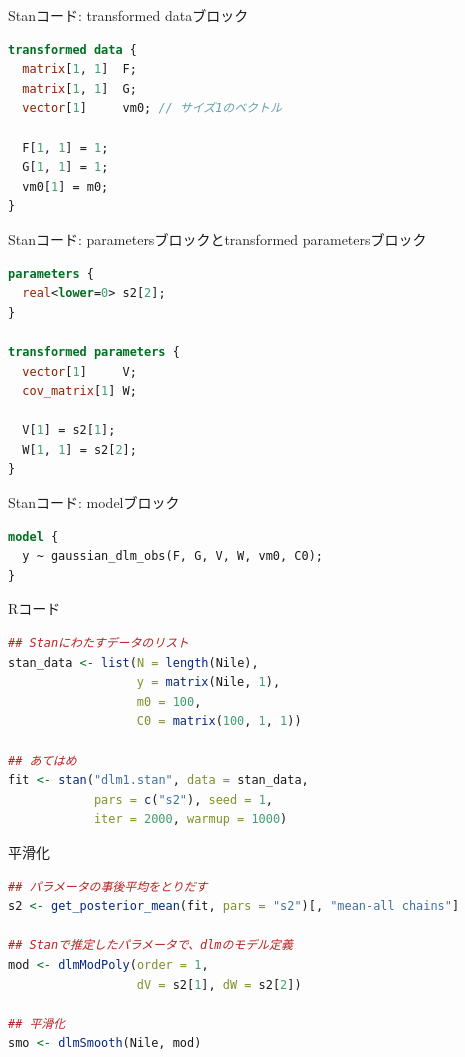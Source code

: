 \documentclass[dvipdfmx,12pt]{beamer}
\begin{document}
\begin{frame}[fragile]{Stanコード: transformed dataブロック}
  \begin{lstlisting}[language=Stan]
transformed data {
  matrix[1, 1]  F;
  matrix[1, 1]  G;
  vector[1]     vm0; // サイズ1のベクトル

  F[1, 1] = 1;
  G[1, 1] = 1;
  vm0[1] = m0;
}
  \end{lstlisting}
\end{frame}

\begin{frame}[fragile]{Stanコード: parametersブロックとtransformed parametersブロック}
  \begin{lstlisting}[language=Stan]
parameters {
  real<lower=0> s2[2];
}

transformed parameters {
  vector[1]     V;
  cov_matrix[1] W;

  V[1] = s2[1];
  W[1, 1] = s2[2];
}
  \end{lstlisting}
\end{frame}

\begin{frame}[fragile]{Stanコード: modelブロック}
  \begin{lstlisting}[language=Stan]
model {
  y ~ gaussian_dlm_obs(F, G, V, W, vm0, C0);
}
  \end{lstlisting}
\end{frame}

\begin{frame}[fragile]{Rコード}
  \begin{lstlisting}[language=R]
## Stanにわたすデータのリスト
stan_data <- list(N = length(Nile),
                  y = matrix(Nile, 1),
                  m0 = 100,
                  C0 = matrix(100, 1, 1))

## あてはめ
fit <- stan("dlm1.stan", data = stan_data,
            pars = c("s2"), seed = 1,
            iter = 2000, warmup = 1000)
  \end{lstlisting}
\end{frame}

\begin{frame}[fragile]{平滑化}
  \begin{lstlisting}[language=R]
## パラメータの事後平均をとりだす
s2 <- get_posterior_mean(fit, pars = "s2")[, "mean-all chains"]

## Stanで推定したパラメータで、dlmのモデル定義
mod <- dlmModPoly(order = 1,
                  dV = s2[1], dW = s2[2])

## 平滑化
smo <- dlmSmooth(Nile, mod)
  \end{lstlisting}
\end{frame}
\end{document}

